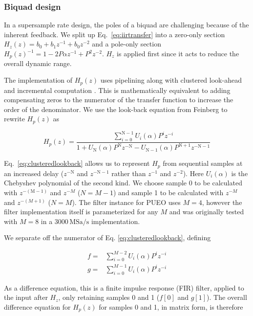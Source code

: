 \documentclass{IEEEtran}
\newcommand{\chebyu}[2]{U_{#1}\left(#2\right)}
\begin{document}
\subsubsection{Biquad design}

In a supersample rate design, the poles of a biquad are challenging
because of the inherent feedback. We split up Eq.~\ref{eq:iirtransfer}
into a zero-only section
$H_z\left(z\right)=b_0+b_1z^{-1}+b_0z^{-2}$ 
and a pole-only section 
$H_p\left(z\right)^{-1}= 1-2P\alpha z^{-1}+P^{2}z^{-2}$. 
$H_{z}$ is applied first since it acts to reduce the overall dynamic range.

The implementation of $H_p\left(z\right)$ uses pipelining along with
clustered look-ahead and incremental computation \cite{parhi2007vlsi}.
This is mathematically equivalent to adding compensating zeros to the
numerator of the transfer function to increase the order of the
denominator. We use the look-back equation from Feinberg
\cite{feinberg116087} to rewrite $H_p\left(z\right)$ as

\begin{equation}
\label{eq:clusteredlookback}
H_{p}\left(z\right)=
\frac{\sum_{i=0}^{\textrm{N}-1} \chebyu{i}{\alpha}P^{i}z^{-i}}
{1+\chebyu{\textrm{N}}{\alpha}P^{\textrm{N}}z^{-\textrm{N}}-\chebyu{\textrm{N}-1}{\alpha}P^{\textrm{N}+1}z^{-\textrm{N}-1}}
\end{equation}

Eq.~\ref{eq:clusteredlookback} allows us to represent $H_{p}$ from 
sequential samples at an increased delay ($z^{-\textrm{N}}$ and
$z^{-\textrm{N}-1}$ rather than $z^{-1}$ and $z^{-2}$). Here 
$U_{i}(\alpha)$ is the Chebyshev polynomial of the second kind.
We choose sample 0 to be calculated with $z^{-(\textrm{M}-1)}$
and $z^{-M}$ ($N=M-1$) and sample 1 to be calculated with $z^{-M}$
and $z^{-(M+1)}$ ($N=M$). The filter instance for PUEO uses $M=4$, however
the filter implementation itself is parameterized for any $M$ and was
originally tested with $M=8$ in a $3000\,\text{MSa/s}$ implementation.

We separate off the numerator of Eq. \ref{eq:clusteredlookback},
defining

\begin{align*}
    f = & \sum_{i=0}^{M-2}\chebyu{i}{\alpha}P^{i}z^{-i}    \\
    g = & \sum_{i=0}^{M-1}\chebyu{i}{\alpha}P^{i}z^{-i}
\end{align*}

As a difference equation, this is a finite impulse response (FIR) filter,
applied to the input after $H_{z}$, only retaining samples 0 and 1
($f\left[0\right]$ and $g\left[1\right]$). The overall difference equation
for $H_{p}\left(z\right)$ for samples 0 and 1, in matrix form, is therefore
\end{document}
